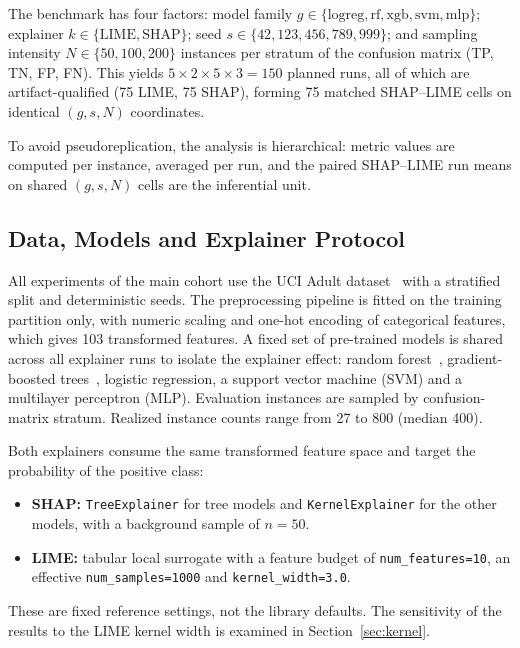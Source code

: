 \documentclass[11pt,a4paper]{article}
\begin{document}
The benchmark has four factors: model family
$g \in \{\mathrm{logreg}, \mathrm{rf}, \mathrm{xgb}, \mathrm{svm},
\mathrm{mlp}\}$; explainer $k \in \{\mathrm{LIME}, \mathrm{SHAP}\}$; seed
$s \in \{42, 123, 456, 789, 999\}$; and sampling intensity
$N \in \{50, 100, 200\}$ instances per stratum of the confusion matrix
(TP, TN, FP, FN). This yields $5 \times 2 \times 5 \times 3 = 150$ planned
runs, all of which are artifact-qualified (75 LIME, 75 SHAP), forming 75
matched SHAP--LIME cells on identical $(g, s, N)$ coordinates.

To avoid pseudoreplication, the analysis is hierarchical: metric values are
computed per instance, averaged per run, and the paired SHAP--LIME run
means on shared $(g, s, N)$ cells are the inferential unit.

\subsection{Data, Models and Explainer Protocol}
\label{sec:data}

All experiments of the main cohort use the UCI Adult
dataset~\cite{kohavi1996scaling,becker1996adult} with a stratified split
and deterministic seeds. The preprocessing pipeline is fitted on the
training partition only, with numeric scaling and one-hot encoding of
categorical features, which gives 103 transformed features. A fixed set of
pre-trained models is shared across all explainer runs to isolate the
explainer effect: random forest~\cite{breiman2001random}, gradient-boosted
trees~\cite{chen2016xgboost}, logistic regression, a support vector machine
(SVM) and a multilayer perceptron (MLP). Evaluation instances are sampled
by confusion-matrix stratum. Realized instance counts range from 27 to 800
(median 400).

Both explainers consume the same transformed feature space and target the
probability of the positive class:
\begin{itemize}
\item \textbf{SHAP:} \texttt{TreeExplainer} for tree models and
\texttt{KernelExplainer} for the other models, with a background sample of
$n=50$.
\item \textbf{LIME:} tabular local surrogate with a feature budget of
\texttt{num\_features=10}, an effective \texttt{num\_samples=1000} and
\texttt{kernel\_width=3.0}.
\end{itemize}
\label{sec:explainer_protocol}
These are fixed reference settings, not the library defaults. The
sensitivity of the results to the LIME kernel width is examined in
Section~\ref{sec:kernel}.
\end{document}
